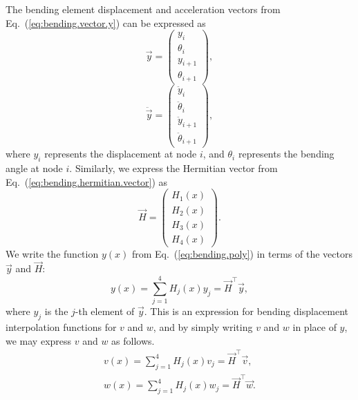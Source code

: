 The bending element displacement and acceleration vectors from Eq.~(\ref{eq:bending.vector.y}) can be expressed as
\begin{equation}
\vec y = 
\begin{pmatrix}
y_i \\
\theta_i \\
y_{i+1} \\
\theta_{i+1}
\end{pmatrix},
\end{equation}
\begin{equation}
\ddot{\vec y} = 
\begin{pmatrix}
\ddot y_i \\
\ddot\theta_i \\
\ddot y_{i+1} \\
\ddot\theta_{i+1}
\end{pmatrix},
\end{equation}
where $y_i$ represents the displacement at node $i$, and $\theta_i$ represents the bending angle at node $i$. Similarly, we express the Hermitian vector from Eq.~(\ref{eq:bending.hermitian.vector}) as
\begin{equation}
\vec{H} = 
\begin{pmatrix}
H_1(x) \\
H_2(x) \\
H_3(x) \\
H_4(x)
\end{pmatrix}.
\end{equation}
We write the function $y(x)$ from Eq.~(\ref{eq:bending.poly}) in terms of the vectors $\vec{y}$ and $\vec H$:
\begin{equation}
y(x) = \sum_{j=1}^4 H_j(x)y_j = \vec{H}^\top \vec{y},
\end{equation}
where $y_j$ is the $j$-th element of $\vec{y}$. This is an expression for bending displacement interpolation functions for $v$ and $w$, and by simply writing $v$ and $w$ in place of $y$, we may express $v$ and $w$ as follows.
\begin{eqnarray}
v(x) = \sum_{j=1}^4 H_j(x)v_j = \vec{H}^\top \vec{v}, \\
w(x) = \sum_{j=1}^4 H_j(x)w_j = \vec{H}^\top \vec{w}.
\end{eqnarray}

